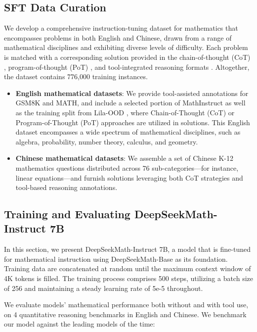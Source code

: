 \begin{itemize}[topsep=0pt]
\subsection{SFT Data Curation}

We develop a comprehensive instruction-tuning dataset for mathematics that encompasses problems in both English and Chinese, drawn from a range of mathematical disciplines and exhibiting diverse levels of difficulty. Each problem is matched with a corresponding solution provided in the chain-of-thought (CoT) \citep{cot}, program-of-thought (PoT) \citep{pot,pal}, and tool-integrated reasoning formats \citep{tora}. Altogether, the dataset contains 776,000 training instances.

\begin{itemize}[topsep=0pt]
    \item \textbf{English mathematical datasets}: We provide tool-assisted annotations for GSM8K and MATH, and include a selected portion of MathInstruct \citep{MathInstruct} as well as the training split from Lila-OOD \citep{lila}, where Chain-of-Thought (CoT) or Program-of-Thought (PoT) approaches are utilized in solutions. This English dataset encompasses a wide spectrum of mathematical disciplines, such as algebra, probability, number theory, calculus, and geometry.
    \item \textbf{Chinese mathematical datasets}: We assemble a set of Chinese K-12 mathematics questions distributed across 76 sub-categories—for instance, linear equations—and furnish solutions leveraging both CoT strategies and tool-based reasoning annotations.
\end{itemize}

\subsection{Training and Evaluating DeepSeekMath-Instruct 7B}

In this section, we present DeepSeekMath-Instruct 7B, a model that is fine-tuned for mathematical instruction using DeepSeekMath-Base as its foundation. Training data are concatenated at random until the maximum context window of 4K tokens is filled. The training process comprises 500 steps, utilizing a batch size of 256 and maintaining a steady learning rate of 5e-5 throughout.

We evaluate models' mathematical performance both without and with tool use, on 4 quantitative reasoning benchmarks in English and Chinese. We benchmark our model against the leading models of the time:


\end{itemize}
